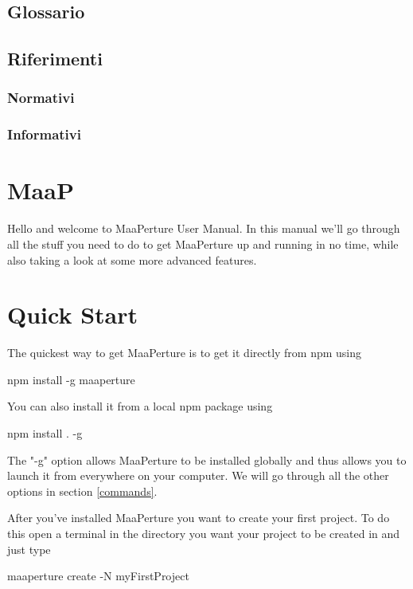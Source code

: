 \subsection{Glossario}
\Glossario{}

\subsection{Riferimenti}

\subsubsection{Normativi}


\subsubsection{Informativi}


\newpage
\section{MaaP}
Hello and welcome to MaaPerture User Manual.
In this manual we'll go through all the stuff you need to do to get MaaPerture up and running in no time, while also taking a look at some more advanced features.


\newpage
\section{Quick Start}
The quickest way to get MaaPerture is to get it directly from npm using
\begin{center}
npm install -g maaperture
\end{center}

You can also install it from a local npm package using 
\begin{center}
npm install . -g
\end{center}

The "-g" option allows MaaPerture to be installed globally and thus allows you to launch it from everywhere on your computer.
We will go through all the other options in section \ref{commands}.

After you've installed MaaPerture you want to create your first project.
To do this open a terminal in the directory you want your project to be created in and just type
\begin{center}
 maaperture create -N myFirstProject
\end{center}

